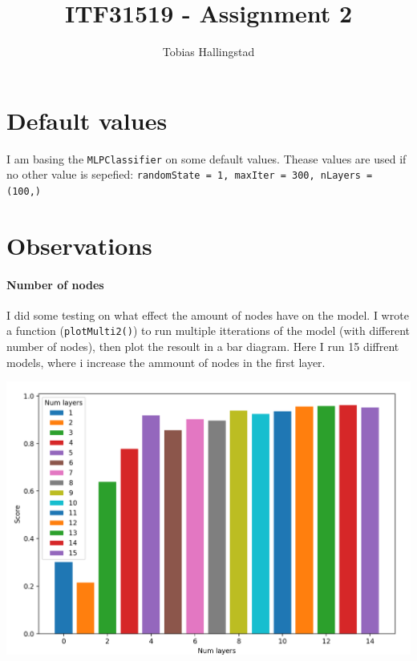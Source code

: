 \documentclass[10pt]{article}
\title{ITF31519 - Assignment 2}
\author{Tobias Hallingstad}
\begin{document}
    \begin{titlepage}
        \maketitle
    \end{titlepage}


    \section{Default values}
    I am basing the \texttt{MLPClassifier} on some default values. Thease values are used if no other value is sepefied: \texttt{randomState = 1, maxIter = 300, nLayers = (100,)}

    \section{Observations}
        \paragraph{Number of nodes}
        I did some testing on what effect the amount of nodes have on the model. I wrote a function (\texttt{plotMulti2()}) to run multiple itterations of the model (with different number of nodes), then plot the resoult in a bar diagram. Here I run 15 diffrent models, where i increase the ammount of nodes in the first layer.

        \begin{center}
            \includegraphics[scale=0.35]{Figure_1}
        \end{center}
\end{document}
